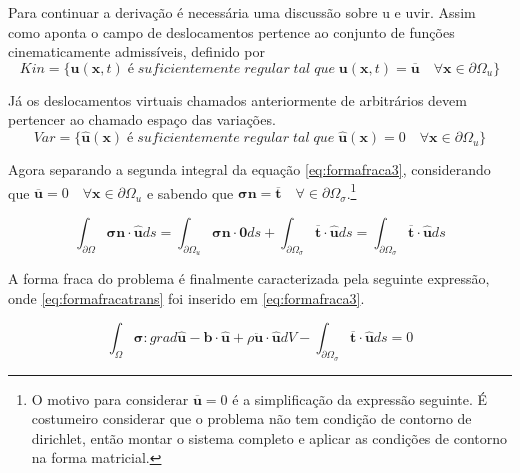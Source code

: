 Para continuar a derivação é necessária uma discussão sobre \gls{u} e \gls{uvir}.  Assim como aponta \cite{Paulo} o campo de deslocamentos pertence ao conjunto de funções cinematicamente admissíveis, definido por 
\begin{equation}
	Kin = \{ \boldsymbol{u}(\boldsymbol{x},t) \; é \; suficientemente \; regular \; tal \; que \; \boldsymbol{u}(\boldsymbol{x},t) = \boldsymbol{\overline{u}}  \quad \forall \boldsymbol{x} \in \partial \Omega_u \}
\end{equation}

Já os deslocamentos virtuais chamados anteriormente de arbitrários devem pertencer ao chamado espaço das variações.
\begin{equation}
	Var  = \{ \boldsymbol{\hat{u}}(\boldsymbol{x}) \; é \; suficientemente \; regular \; tal \; que \; \boldsymbol{\hat{u}}(\boldsymbol{x}) = 0  \quad \forall \boldsymbol{x} \in \partial \Omega_u \}
\end{equation}


Agora separando a segunda integral da equação \ref{eq:formafraca3}, considerando que $ \boldsymbol{\overline{u}} = 0 \quad \forall \boldsymbol{x} \in \partial \Omega_u $ e sabendo que $ \boldsymbol{\sigma n} = \boldsymbol{\overline{t}} \quad \forall \in \partial \Omega_{\sigma} $.\footnote{O motivo para considerar $ \boldsymbol{\overline{u}} = 0$ é a simplificação da expressão seguinte. É costumeiro considerar que o problema não tem condição de contorno de dirichlet, então montar o sistema completo e aplicar as condições de contorno na forma matricial. }

\begin{equation} \label{eq:formafracatrans}
	\int_{\partial \Omega} \boldsymbol{\sigma n} \cdot \boldsymbol{\hat{u}} ds = \int_{\partial \Omega_u} \boldsymbol{\sigma n} \cdot \boldsymbol{0} ds + \int_{\partial \Omega_{\sigma}} \boldsymbol{\overline{t}} \cdot \boldsymbol{\hat{u}} ds = \int_{\partial \Omega_{\sigma}} \boldsymbol{\overline{t}} \cdot \boldsymbol{\hat{u}} ds 
\end{equation}

A forma fraca do problema é finalmente caracterizada pela seguinte expressão, onde \ref{eq:formafracatrans} foi inserido em \ref{eq:formafraca3}.

\begin{equation} \label{eq:formafracafinal}
	\int_{\Omega} \boldsymbol{\sigma} : grad \boldsymbol{\hat{u}} -  \boldsymbol{b} \cdot \boldsymbol{\hat{u}} +  \rho\ddot{\boldsymbol{u}} \cdot \boldsymbol{\hat{u}}  dV - \int_{\partial \Omega_{\sigma}} \boldsymbol{\overline{t}} \cdot \boldsymbol{\hat{u}} ds = 0 
\end{equation}

